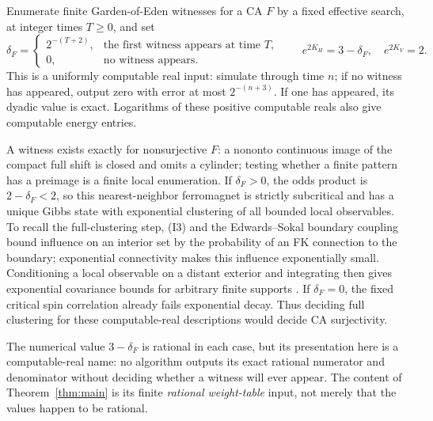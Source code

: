 \begin{remark}\label{rem:real}
Enumerate finite Garden-of-Eden witnesses for a CA $F$ by a fixed effective search, at integer times $T\ge0$, and set
\[
 \delta_F=\begin{cases}2^{-(T+2)},&\text{the first witness appears at time }T,\\
                       0,&\text{no witness appears}.\end{cases}
 \qquad e^{2K_H}=3-\delta_F,\quad e^{2K_V}=2.
\]
This is a uniformly computable real input: simulate through time $n$; if no witness has appeared, output zero with error at most $2^{-(n+3)}$. If one has appeared, its dyadic value is exact. Logarithms of these positive computable reals also give computable energy entries.

A witness exists exactly for nonsurjective $F$: a nononto continuous image of the compact full shift is closed and omits a cylinder; testing whether a finite pattern has a preimage is a finite local enumeration. If $\delta_F>0$, the odds product is $2-\delta_F<2$, so this nearest-neighbor ferromagnet is strictly subcritical and has a unique Gibbs state with exponential clustering of all bounded local observables. To recall the full-clustering step, (I3) and the Edwards--Sokal boundary coupling bound influence on an interior set by the probability of an FK connection to the boundary; exponential connectivity makes this influence exponentially small. Conditioning a local observable on a distant exterior and integrating then gives exponential covariance bounds for arbitrary finite supports \cite[Chapters 3 and 6]{FV}. If $\delta_F=0$, the fixed critical spin correlation already fails exponential decay. Thus deciding full clustering for these computable-real descriptions would decide CA surjectivity.

The numerical value $3-\delta_F$ is rational in each case, but its presentation here is a computable-real name: no algorithm outputs its exact rational numerator and denominator without deciding whether a witness will ever appear. The content of Theorem~\ref{thm:main} is its finite \emph{rational weight-table} input, not merely that the values happen to be rational.
\end{remark}
